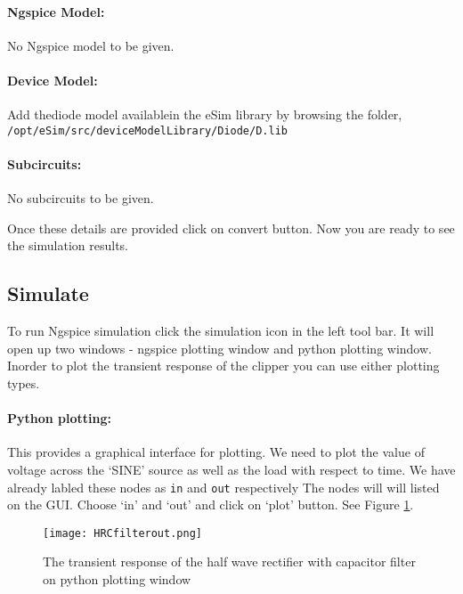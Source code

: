 \paragraph{Ngspice Model:} No Ngspice model to be given.

\paragraph{Device Model:} Add thediode model availablein the eSim library by browsing the folder, \texttt{/opt/eSim/src/deviceModelLibrary/Diode/D.lib}

\paragraph{Subcircuits:} No subcircuits to be given.

\noindent Once these details are provided click on convert button.  Now you are ready to see the simulation results.


\paragraph{}
\subsection*{Simulate} To run Ngspice simulation click the simulation icon in the left tool bar. It will open up two windows - ngspice plotting window and python plotting window. Inorder to plot the transient response of the clipper you can use either plotting types.

\paragraph{Python plotting:}This provides a graphical interface for plotting. We need to plot the value of voltage across the `SINE' source as well as the load with respect to time. We have already labled these nodes as \texttt{in} and \texttt{out} respectively The nodes will will listed on the GUI. Choose  `in' and `out' and click on `plot' button. See Figure \ref{HRCfilterout}.

\begin{figure}[h]
\centering
\texttt{[image: HRCfilterout.png]}
\caption{The transient response of the half wave rectifier with capacitor filter on python plotting window}
\label{HRCfilterout}
\end{figure}

